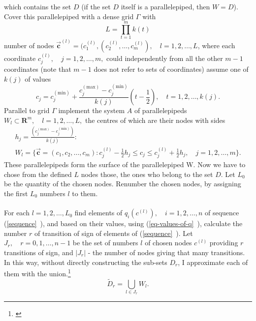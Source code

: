 \documentclass[11pt,a4paper]{article}
\numberwithin{equation}{subsection}
\newcommand{\vecc}{\vec{\textbf{c}}}
\begin{document}
which contains the set $D$ (if the set $D$ itself is a parallelepiped, then $W=D$). Cover this parallelepiped with a dense grid $\Gamma$ with
\begin{equation}
L = \prod\limits_{t=1}^{m}k(t)
\end{equation}
number of nodes $\vecc^{(l)} = (c_{1}^{(l)},(c_{2}^{(l)},\dots,c_{m}^{(l)}),\quad l=1,2,\dots,L$, where each coordinate $c_{j}^{(l)}, \quad j=1,2,\dots,m,$ could independently from all the other $m-1$ coordinates (note that $m-1$ does not refer to sets of coordinates) assume one of $k(j)$ of values
\begin{equation}
c_{j}=c_{j}^{(\text{min})} + \frac{c_{j}^{(\text{max})}-c_{j}^{(\text{min})}}{k(j)}(t-\frac{1}{2}), \quad t=1,2,\dots,k(j).
\end{equation}
Parallel to grid $\Gamma$ implement the system $A$ of parallelepipeds $W_{l} \subset \boldsymbol{R}^{m}, \quad l=1,2,\dots,L,$ the centres of which are their nodes with sides
\begin{gather}
h_{j} = \frac{(c_{j}^{(\text{max})}-c_{j}^{(\text{min})})}{k(j)}: \\
W_{l} = \lbrace \vecc=(c_{1},c_{2},\dots,c_{m}):c_{j}^{(l)}-\frac{1}{2} h_{j} \leq c_{j} \leq c_{j}^{(l)}+\frac{1}{2} h_{j}, \quad j=1,2,\dots,m \rbrace .
\end{gather}
These parallelepipeds form the surface of the parallelepiped W. Now we have to chose from the defined $L$ nodes those, the ones who belong to the set $D$. Let $L_{0}$ be the quantity of the chosen nodes. Renumber the chosen nodes, by assigning the first $L_{0}$ numbers $l$ to them. \\
\\
For each $l=1,2,\dots,L_{0}$ find elements of $q_{i}(c^{(l)}), \quad i=1,2,\dots,n$ of sequence (\vref{sequence}~), and based on their values, using (\vref{eq-values-of-q}~), calculate the number $r$ of transition of sign of elements of (\vref{sequence}~). Let $J_{r}, \quad r=0,1,\dots,n-1$ be the set of numbers $l$ of chosen nodes $c^{(l)}$ providing $r$ transitions of sign, and $|J_{r}|$ - the number of nodes giving that many transitions. In this way, without directly constructing the sub-sets $D_{r}$, I approximate each of them with the union.\footnote{\cite{smith_eggen_andre_2015}}
\begin{equation}
\tilde{D}_{r} = \bigcup_{l \in J_{r}} W_{l}. \tag*{(\theequation)\protect\footnotemark}
\end{equation}
\end{document}
